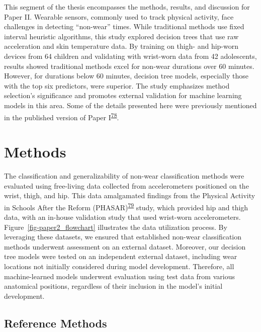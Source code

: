 \documentclass[
  9pt,
]{scrbook}
\begin{document}
This segment of the thesis encompasses the methods, results, and
discussion for Paper II. Wearable sensors, commonly used to track
physical activity, face challenges in detecting ``non-wear'' times.
While traditional methods use fixed interval heuristic algorithms, this
study explored decision trees that use raw acceleration and skin
temperature data. By training on thigh- and hip-worn devices from 64
children and validating with wrist-worn data from 42 adolescents,
results showed traditional methods excel for non-wear durations over 60
minutes. However, for durations below 60 minutes, decision tree models,
especially those with the top six predictors, were superior. The study
emphasizes method selection's significance and promotes external
validation for machine learning models in this area. Some of the details
presented here were previously mentioned in the published version of
Paper
I\textsuperscript{\protect\hyperlink{ref-skovgaard_generalizability_2023}{78}}.

\hypertarget{methods-1}{%
\section{Methods}\label{methods-1}}

The classification and generalizability of non-wear classification
methods were evaluated using free-living data collected from
accelerometers positioned on the wrist, thigh, and hip. This data
amalgamated findings from the Physical Activity in Schools After the
Reform
(PHASAR)\textsuperscript{\protect\hyperlink{ref-pedersen_protocol_2018}{79}}
study, which provided hip and thigh data, with an in-house validation
study that used wrist-worn accelerometers.
Figure~\ref{fig-paper2_flowchart} illustrates the data utilization
process. By leveraging these datasets, we ensured that established
non-wear classification methods underwent assessment on an external
dataset. Moreover, our decision tree models were tested on an
independent external dataset, including wear locations not initially
considered during model development. Therefore, all machine-learned
models underwent evaluation using test data from various anatomical
positions, regardless of their inclusion in the model's initial
development.

\hypertarget{reference-methods}{%
\subsection{Reference Methods}\label{reference-methods}}
\end{document}
